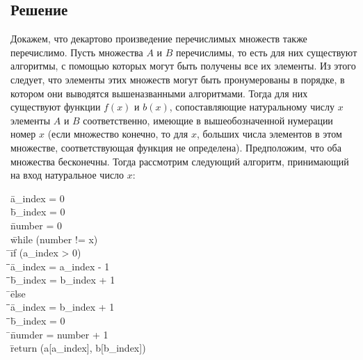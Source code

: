 \documentclass[a4paper,12pt]{article}
\newcommand{\tab}{\quad\=}
\newenvironment{programm}{
    \ttfamily
    \begin{tabbing}
    }
    {
    \end{tabbing}
}
\begin{document}
	\subsection*{Решение}
	
    Докажем, что декартово произведение перечислимых множеств также перечислимо. Пусть множества $A$ и $B$ перечислимы, то есть для них существуют алгоритмы, с помощью которых могут быть получены все их элементы. Из этого следует, что элементы этих множеств могут быть пронумерованы в порядке, в котором они выводятся вышеназванными алгоритмами. Тогда для них существуют функции $f(x)$ и $b(x)$, сопоставляющие натуральному числу $x$ элементы $A$ и $B$ соответственно, имеющие в вышеобозначенной нумерации номер $x$ (если множество конечно, то для $x$, больших числа элементов в этом множестве, соответствующая функция не определена).  Предположим, что оба множества бесконечны. Тогда рассмотрим следующий алгоритм, принимающий на вход натуральное число $x$:
    \begin{programm}
    \tab a\_index = 0\\
    \tab b\_index = 0\\
    \tab number = 0\\
    \tab while (number != x)\\
    \tab \tab if (a\_index > 0)\\
    \tab \tab \tab a\_index = a\_index - 1\\
    \tab \tab \tab b\_index = b\_index + 1\\
    \tab \tab else\\
    \tab \tab \tab a\_index = b\_index + 1\\
    \tab \tab \tab b\_index = 0\\
    \tab \tab numder = number + 1\\
    \tab return (a[a\_index], b[b\_index])\\
    \end{programm}
	
\end{document}
